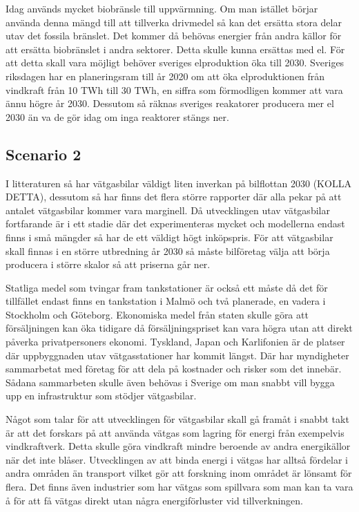 \documentclass[a4paper,11pt,fleqn, titlepage]{article}
\begin{document}
Idag används mycket biobränsle till uppvärmning. Om man istället börjar använda denna mängd till att tillverka drivmedel så kan det ersätta stora delar utav det fossila bränslet. Det kommer då behövas energier från andra källor för att ersätta biobränslet i andra sektorer. Detta skulle kunna ersättas med el. För att detta skall vara möjligt behöver sveriges elproduktion öka till 2030. Sveriges riksdagen har en planeringsram till år 2020 om att öka elproduktionen från vindkraft från 10 TWh till 30 TWh, en siffra som förmodligen kommer att vara ännu högre år 2030. Dessutom så räknas sveriges reakatorer producera mer el 2030 än va de gör idag om inga reaktorer stängs ner.


\subsection{Scenario 2}
I litteraturen så har vätgasbilar väldigt liten inverkan på bilflottan 2030 (KOLLA DETTA), dessutom så har finns det flera större rapporter där alla pekar på att antalet vätgasbilar kommer vara marginell.
Då utvecklingen utav vätgasbilar fortfarande är i ett stadie där det experimenteras mycket och modellerna endast finns i små mängder så har de ett väldigt högt inköpspris. För att vätgasbilar skall finnas i en större utbredning år 2030 så måste bilföretag välja att börja producera i större skalor så att priserna går ner.

Statliga medel som tvingar fram tankstationer är också ett måste då det för tillfället endast finns en tankstation i Malmö och två planerade, en vadera i Stockholm och Göteborg.
Ekonomiska medel från staten skulle göra att försäljningen kan öka tidigare då försäljningspriset kan vara högra utan att direkt påverka privatpersoners ekonomi.
Tyskland, Japan och Karlifonien är de platser där uppbyggnaden utav vätgasstationer har kommit längst. Där har myndigheter sammarbetat med företag för att dela på kostnader och risker som det innebär. Sådana sammarbeten skulle även behövas i Sverige om man snabbt vill bygga upp en infrastruktur som stödjer vätgasbilar.

Något som talar för att utvecklingen för vätgasbilar skall gå framåt i snabbt takt är att det forskars på att använda vätgas som lagring för energi från exempelvis vindkraftverk. Detta skulle göra vindkraft mindre beroende av andra energikällor när det inte blåser. Utvecklingen av att binda energi i vätgas har alltså fördelar i andra områden än transport vilket gör att forskning inom området är lönsamt för flera. Det finns även industrier som har vätgas som spillvara som man kan ta vara å för att få vätgas direkt utan några energiförluster vid tillverkningen.


\printbibliography
\end{document}
